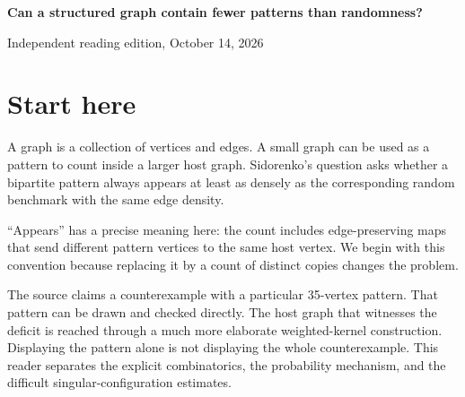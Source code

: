 \documentclass[11pt]{article}
\begin{document}
\begin{center}{\LARGE\bfseries Can a structured graph contain fewer patterns than randomness?}\par\vspace{12pt}{\large An illustrated reader for the proposed Sidorenko counterexample}\par\vspace{16pt}Independent reading edition, October 14, 2026\end{center}
\section*{Start here}A graph is a collection of vertices and edges. A small graph can be used as a pattern to count inside a larger host graph. Sidorenko's question asks whether a bipartite pattern always appears at least as densely as the corresponding random benchmark with the same edge density.

``Appears'' has a precise meaning here: the count includes edge-preserving maps that send different pattern vertices to the same host vertex. We begin with this convention because replacing it by a count of distinct copies changes the problem.

The source claims a counterexample with a particular 35-vertex pattern. That pattern can be drawn and checked directly. The host graph that witnesses the deficit is reached through a much more elaborate weighted-kernel construction. Displaying the pattern alone is not displaying the whole counterexample. This reader separates the explicit combinatorics, the probability mechanism, and the difficult singular-configuration estimates.
\end{document}
